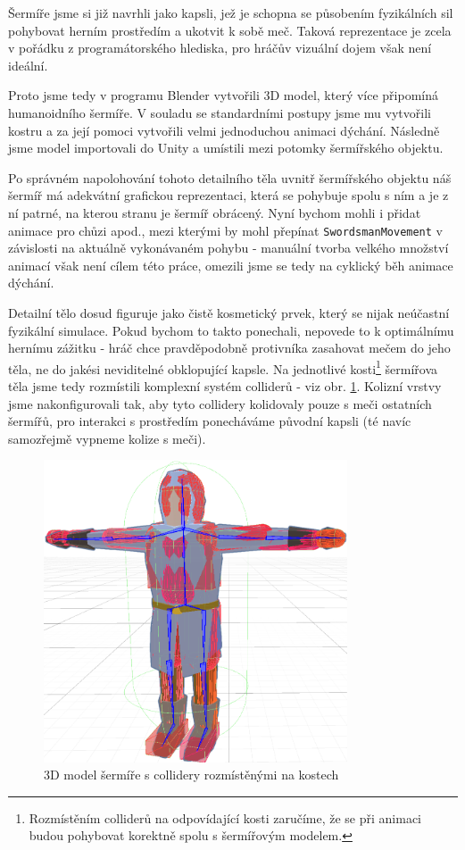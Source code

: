Šermíře jsme si již navrhli jako kapsli, jež je schopna se působením fyzikálních sil pohybovat herním prostředím a ukotvit k sobě meč. Taková reprezentace je zcela v pořádku z programátorského hlediska, pro hráčův vizuální dojem však není ideální.

Proto jsme tedy v programu Blender \cite{Blender} vytvořili 3D model, který více připomíná humanoidního šermíře. V souladu se standardními postupy jsme mu vytvořili kostru a za její pomoci vytvořili velmi jednoduchou animaci dýchání. Následně jsme model importovali do Unity a umístili mezi potomky šermířského objektu.

Po správném napolohování tohoto detailního těla uvnitř šermířského objektu náš šermíř má adekvátní grafickou reprezentaci, která se pohybuje spolu s ním a je z ní patrné, na kterou stranu je šermíř obrácený. Nyní bychom mohli i přidat animace pro chůzi apod., mezi kterými by mohl přepínat \texttt{SwordsmanMovement} v závislosti na aktuálně vykonávaném pohybu - manuální tvorba velkého množství animací však není cílem této práce, omezili jsme se tedy na cyklický běh animace dýchání. 

Detailní tělo dosud figuruje jako čistě kosmetický prvek, který se nijak neúčastní fyzikální simulace. Pokud bychom to takto ponechali, nepovede to k optimálnímu hernímu zážitku - hráč chce pravděpodobně protivníka zasahovat mečem do jeho těla, ne do jakési neviditelné obklopující kapsle. Na jednotlivé kosti\footnote{Rozmístěním colliderů na odpovídající kosti zaručíme, že se při animaci budou pohybovat korektně spolu s šermířovým modelem.} šermířova těla jsme tedy rozmístili komplexní systém colliderů - viz obr. \ref{obr05:swordsmanDetailedColliders}. Kolizní vrstvy jsme nakonfigurovali tak, aby tyto collidery kolidovaly pouze s meči ostatních šermířů, pro interakci s prostředím ponecháváme původní kapsli (té navíc samozřejmě vypneme kolize s meči). 

\begin{figure}[ht]\centering
  \center
  \includegraphics[width=90mm]{../img/swordsmanBodyColliders.png}
  \caption{3D model šermíře s collidery rozmístěnými na kostech}
  \label{obr05:swordsmanDetailedColliders}
\end{figure} 


